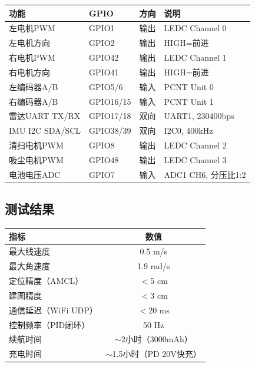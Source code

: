 \documentclass[12pt,a4paper]{ctexart}
\begin{document}
\begin{center}
\begin{tabular}{llll}
\toprule
\textbf{功能} & \textbf{GPIO} & \textbf{方向} & \textbf{说明} \\
\midrule
左电机PWM    & GPIO1  & 输出 & LEDC Channel 0 \\
左电机方向   & GPIO2  & 输出 & HIGH=前进 \\
右电机PWM    & GPIO42 & 输出 & LEDC Channel 1 \\
右电机方向   & GPIO41 & 输出 & HIGH=前进 \\
左编码器A/B  & GPIO5/6  & 输入 & PCNT Unit 0 \\
右编码器A/B  & GPIO16/15 & 输入 & PCNT Unit 1 \\
雷达UART TX/RX & GPIO17/18 & 双向 & UART1, 230400bps \\
IMU I2C SDA/SCL & GPIO38/39 & 双向 & I2C0, 400kHz \\
清扫电机PWM  & GPIO8  & 输出 & LEDC Channel 2 \\
吸尘电机PWM  & GPIO48 & 输出 & LEDC Channel 3 \\
电池电压ADC  & GPIO7  & 输入 & ADC1 CH6, 分压比1:2 \\
\bottomrule
\end{tabular}
\end{center}

\subsection{测试结果}

\begin{resultbox}[性能指标]
\begin{center}
\begin{tabular}{lc}
\toprule
\textbf{指标} & \textbf{数值} \\
\midrule
最大线速度        & 0.5 m/s \\
最大角速度        & 1.9 rad/s \\
定位精度（AMCL）  & $<$5 cm \\
建图精度          & $<$3 cm \\
通信延迟（WiFi UDP） & $<$20 ms \\
控制频率（PID闭环） & 50 Hz \\
续航时间          & $\sim$2小时（3000mAh） \\
充电时间          & $\sim$1.5小时（PD 20V快充） \\
\bottomrule
\end{tabular}
\end{center}
\end{resultbox}
\end{document}
